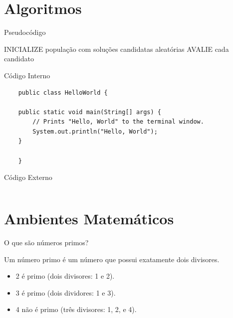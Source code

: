 \documentclass{beamer}
\begin{document}
\section{Algoritmos}

\begin{frame}{Pseudocódigo}
  \begin{algorithm2e}[H]
    \DontPrintSemicolon
    \LinesNumbered
    \SetAlgoLined
    \BlankLine
    \BlankLine
    INICIALIZE população com soluções candidatas aleatórias\;
    AVALIE cada candidato\;
  \caption{Pseudocódigo de Algoritmos Evolucionários \label {alg:pseudocodigoAlgoritmosEvolucionarios}}
  \end{algorithm2e}
\end{frame}

\begin{frame}[fragile]{Código Interno}
  \begin{verbatim}
    public class HelloWorld {

	public static void main(String[] args) {
	    // Prints "Hello, World" to the terminal window.
	    System.out.println("Hello, World");
	}

    }
  \end{verbatim}
\end{frame}

\begin{frame}[fragile]{Código Externo}
  \inputminted[fontsize=\tiny]{groovy}{cod/Periodo.groovy}
\end{frame}


\section{Ambientes Matemáticos}

\begin{frame}{O que são números primos?}
  \begin{definition}
    Um \alert{número primo} é um número que possui exatamente dois divisores.
  \end{definition}
  \begin{example}
    \begin{itemize}
    \item 2 é primo (dois divisores: 1 e 2).
    \item 3 é primo (dois dividores: 1 e 3).
    \item 4 não é primo (\alert{três} divisores: 1, 2, e 4).
    \end{itemize}
  \end{example}
\end{frame}
\end{document}
